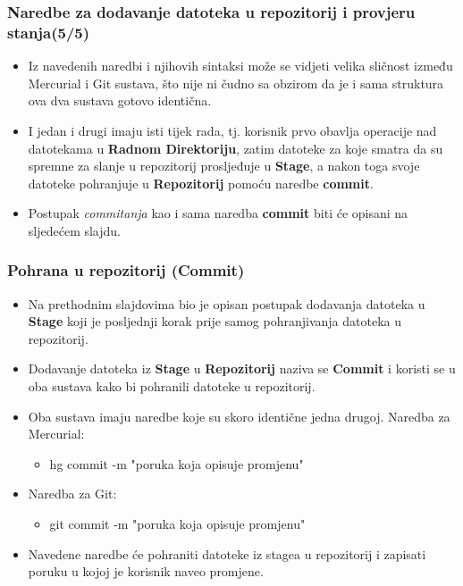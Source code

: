 \documentclass{beamer}
\begin{document}
	\begin{frame}
		\frametitle{Naredbe za dodavanje datoteka u repozitorij i provjeru stanja(5/5)}
 		\begin{itemize}
			\item Iz navedenih naredbi i njihovih sintaksi može se vidjeti velika sličnost između Mercurial i Git sustava, što nije ni čudno sa obzirom da je i sama struktura ova dva sustava gotovo identična.
			\item I jedan i drugi imaju isti tijek rada, tj. korisnik prvo obavlja operacije nad datotekama u \textbf{Radnom Direktoriju}, zatim datoteke za koje smatra da su spremne za slanje u repozitorij prosljeđuje u \textbf{Stage}, a nakon toga svoje datoteke pohranjuje u \textbf{Repozitorij} pomoću naredbe \textbf{commit}.
			\item Postupak \textit{commitanja} kao i sama naredba \textbf{commit} biti će opisani na sljedećem slajdu.
		\end{itemize}
	\end{frame}

	\begin{frame}
		\frametitle{Pohrana u repozitorij (Commit)}
 		\begin{itemize}
			\item Na prethodnim slajdovima bio je opisan postupak dodavanja datoteka u \textbf{Stage} koji je posljednji korak prije samog pohranjivanja datoteka u repozitorij.
			\item Dodavanje datoteka iz \textbf{Stage} u \textbf{Repozitorij} naziva se \textbf{Commit} i koristi se u oba sustava kako bi pohranili datoteke u repozitorij.
			\item Oba sustava imaju naredbe koje su skoro identične jedna drugoj. Naredba za Mercurial:
  			\begin{itemize}						
  				\item hg commit -m "poruka koja opisuje promjenu"
			\end{itemize}
			\item Naredba za Git:
			\begin{itemize}						
  				\item git commit -m "poruka koja opisuje promjenu"
			\end{itemize}
			\item Navedene naredbe će pohraniti datoteke iz stagea u repozitorij i zapisati poruku u kojoj je korisnik naveo promjene.
		\end{itemize}
	\end{frame}
\end{document}
